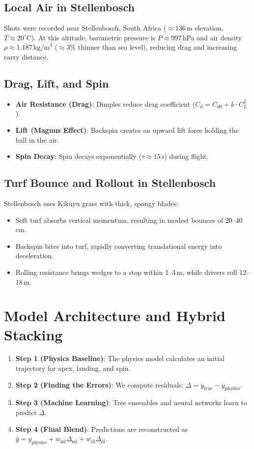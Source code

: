 \documentclass[11pt,a4paper]{article}
\begin{document}
\subsection{Local Air in Stellenbosch}
Shots were recorded near Stellenbosch, South Africa ($\approx 136$\,m elevation, $T \approx 20^\circ\text{C}$). At this altitude, barometric pressure is $P \approx 997$\,hPa and air density $\rho \approx 1.187\,\text{kg/m}^3$ ($\approx 3\%$ thinner than sea level), reducing drag and increasing carry distance.

\subsection{Drag, Lift, and Spin}
\begin{itemize}
    \item \textbf{Air Resistance (Drag)}: Dimples reduce drag coefficient ($C_d = C_{d0} + k \cdot C_L^2$).
    \item \textbf{Lift (Magnus Effect)}: Backspin creates an upward lift force holding the ball in the air.
    \item \textbf{Spin Decay}: Spin decays exponentially ($\tau \approx 15$\,s) during flight.
\end{itemize}

\subsection{Turf Bounce and Rollout in Stellenbosch}
Stellenbosch uses Kikuyu grass with thick, spongy blades:
\begin{itemize}
    \item Soft turf absorbs vertical momentum, resulting in modest bounces of 20--40\,cm.
    \item Backspin bites into turf, rapidly converting translational energy into deceleration.
    \item Rolling resistance brings wedges to a stop within 1--3\,m, while drivers roll 12--18\,m.
\end{itemize}

\section{Model Architecture and Hybrid Stacking}

\begin{enumerate}
    \item \textbf{Step 1 (Physics Baseline)}: The physics model calculates an initial trajectory for apex, landing, and spin.
    \item \textbf{Step 2 (Finding the Errors)}: We compute residuals: $\Delta = y_{\text{true}} - y_{\text{physics}}$.
    \item \textbf{Step 3 (Machine Learning)}: Tree ensembles and neural networks learn to predict $\Delta$.
    \item \textbf{Step 4 (Final Blend)}: Predictions are reconstructed as $\hat{y} = y_{\text{physics}} + w_{\text{ml}}\Delta_{\text{ml}} + w_{\text{dl}}\Delta_{\text{dl}}$.
\end{enumerate}
\end{document}
